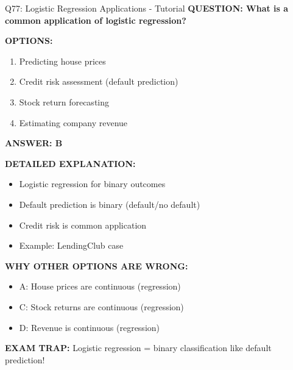 \documentclass[8pt]{beamer}
\begin{document}
	\begin{frame}{Q77: Logistic Regression Applications - Tutorial}
		\fontsize{6.5}{7.5}\selectfont
		\textbf{QUESTION: What is a common application of logistic regression?}
		
		\vspace{0.1cm}
		\textbf{OPTIONS:}
		\begin{enumerate}
			\item Predicting house prices
			\item Credit risk assessment (default prediction)
			\item Stock return forecasting
			\item Estimating company revenue
		\end{enumerate}
		
		\vspace{0.1cm}
		\textcolor{myblue}{\textbf{ANSWER: B}}
		
		\vspace{0.1cm}
		\textbf{DETAILED EXPLANATION:}
		\begin{itemize}
			\item Logistic regression for binary outcomes
			\item Default prediction is binary (default/no default)
			\item Credit risk is common application
			\item Example: LendingClub case
		\end{itemize}
		
		\vspace{0.1cm}
		\textcolor{myred}{\textbf{WHY OTHER OPTIONS ARE WRONG:}}
		\begin{itemize}
			\item \textcolor{myred}{A:} House prices are continuous (regression)
			\item \textcolor{myred}{C:} Stock returns are continuous (regression)
			\item \textcolor{myred}{D:} Revenue is continuous (regression)
		\end{itemize}
		
		\textcolor{myred}{\textbf{EXAM TRAP:}} Logistic regression = \textcolor{myblue}{binary classification} like default prediction!
	\end{frame}
	
\end{document}

